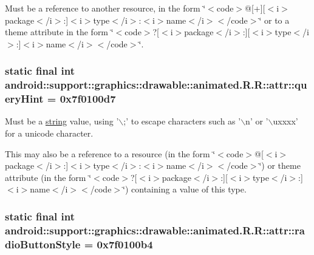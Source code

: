 Must be a reference to another resource, in the form \char`\"{}$<$code$>$@\mbox{[}+\mbox{]}\mbox{[}$<$i$>$package$<$/i$>$:\mbox{]}$<$i$>$type$<$/i$>$:$<$i$>$name$<$/i$>$$<$/code$>$\char`\"{} or to a theme attribute in the form \char`\"{}$<$code$>$?\mbox{[}$<$i$>$package$<$/i$>$:\mbox{]}\mbox{[}$<$i$>$type$<$/i$>$:\mbox{]}$<$i$>$name$<$/i$>$$<$/code$>$\char`\"{}. \hypertarget{classandroid_1_1support_1_1graphics_1_1drawable_1_1animated_1_1_r_1_1attr_0a35262d4e88fea4a4565330e8da18ed}{
\subsubsection[{queryHint}]{\setlength{\rightskip}{0pt plus 5cm}static final int android::support::graphics::drawable::animated.R.R::attr::queryHint = 0x7f0100d7}}
\label{classandroid_1_1support_1_1graphics_1_1drawable_1_1animated_1_1_r_1_1attr_0a35262d4e88fea4a4565330e8da18ed}


Must be a \hyperlink{classandroid_1_1support_1_1graphics_1_1drawable_1_1animated_1_1_r_1_1string}{string} value, using '$\backslash$;' to escape characters such as '$\backslash$n' or '$\backslash$uxxxx' for a unicode character. 

This may also be a reference to a resource (in the form \char`\"{}$<$code$>$@\mbox{[}$<$i$>$package$<$/i$>$:\mbox{]}$<$i$>$type$<$/i$>$:$<$i$>$name$<$/i$>$$<$/code$>$\char`\"{}) or theme attribute (in the form \char`\"{}$<$code$>$?\mbox{[}$<$i$>$package$<$/i$>$:\mbox{]}\mbox{[}$<$i$>$type$<$/i$>$:\mbox{]}$<$i$>$name$<$/i$>$$<$/code$>$\char`\"{}) containing a value of this type. \hypertarget{classandroid_1_1support_1_1graphics_1_1drawable_1_1animated_1_1_r_1_1attr_4f45ce334d60d9839012d2d4f599bd17}{
\subsubsection[{radioButtonStyle}]{\setlength{\rightskip}{0pt plus 5cm}static final int android::support::graphics::drawable::animated.R.R::attr::radioButtonStyle = 0x7f0100b4}}
\label{classandroid_1_1support_1_1graphics_1_1drawable_1_1animated_1_1_r_1_1attr_4f45ce334d60d9839012d2d4f599bd17}


